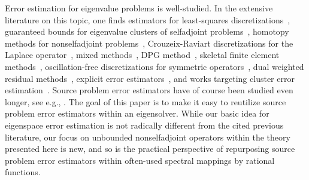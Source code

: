 \documentclass[12pt, oneside, reqno]{amsart}
\theoremstyle{remark}
\begin{document}
Error estimation for eigenvalue problems is well-studied.  In the
extensive literature on this topic, one finds estimators for
least-squares discretizations~\cite{BerBof2022-1, BerBof2020-1},
guaranteed bounds for eigenvalue clusters of selfadjoint
problems~\cite{CanEtAl2017-1, CanEtAl2020-1}, homotopy methods for
nonselfadjoint problems~\cite{CarstensenEtAl2011-1}, Crouzeix-Raviart
discretizations for the Laplace operator~\cite{CartensenEtAl2015-1,%
CarGed2014-1}, mixed methods~\cite{Boffi2010-1}, DPG
method~\cite{BerBofSch2023-1}, skeletal finite
element methods~\cite{CarZhaZha2020-1}, oscillation-free
discretizations for symmetric operators~\cite{CarGed2011-1}, dual
weighted residual methods~\cite{HeuRan2001-1, RanWesWol2010-1},
explicit error estimators~\cite{Lar2000-1}, and works targeting
cluster error estimation~\cite{CanEtAl2020-1, 
  GianiEtAl2012-1, GianiEtAl2016-1}. Source problem error estimators
have of course been studied even longer, see e.g., \cite{AinOde1997-1, BabRhe1979-1,
  BabRhe1978-1, DieJosHue1998-1, HakNeuOva2017-1, NagZhaZho2006-1, ZieZhu1992-1,
  ZieZhu1992-2}.  The goal of this
paper is to make it easy to reutilize source problem error estimators
within an eigensolver.  While our basic idea for eigenspace error
estimation is not radically different from the cited previous
literature, our focus on unbounded nonselfadjoint operators within the
theory presented here is new, and so is the practical perspective of repurposing
source problem error estimators within often-used spectral mappings by
rational functions.
\end{document}
